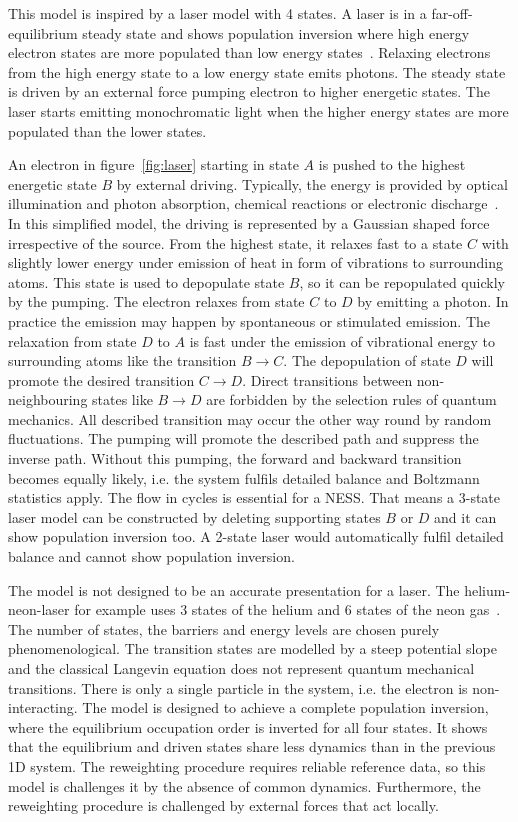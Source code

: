 This model is inspired by a laser model with 4 states. A laser is in a far-off-equilibrium steady state and shows population inversion where high energy electron states are more populated than low energy states~\cite{kaschke2013optical}. Relaxing electrons from the high energy state to a low energy state emits photons. The steady state is driven by an external force pumping  electron to higher energetic states. The laser starts emitting monochromatic light when the higher energy states are more  populated than the lower states. 

An electron in figure~\ref{fig:laser} starting in state $A$ is pushed to the highest energetic state $B$ by external driving. Typically, the energy is provided by optical illumination and photon absorption, chemical reactions or electronic discharge~\cite{kaschke2013optical}. In this simplified model, the driving is represented by a Gaussian shaped force irrespective of the source. From the highest state, it relaxes fast to a state $C$ with slightly lower energy under emission of heat in form of vibrations to surrounding atoms. This state is used to depopulate state $B$, so it can be repopulated quickly by the pumping. The electron relaxes from state $C$ to $D$  by emitting a photon. In practice the emission may happen by spontaneous or stimulated emission. The  relaxation from state $D$ to $A$ is fast under the emission of vibrational energy to surrounding atoms like the transition $B \rightarrow C$. 
The depopulation of state $D$ will promote the desired transition $C \rightarrow D$. Direct transitions between non-neighbouring states like $B \rightarrow D$ are forbidden by the selection rules of quantum mechanics. All described transition may occur the other way round by random fluctuations. The pumping will promote the described path and suppress the inverse path. Without this pumping, the forward and backward transition becomes equally likely, i.e. the system fulfils detailed balance and Boltzmann statistics apply. The flow in cycles is essential for a NESS. That means a 3-state laser model can be constructed by deleting supporting states $B$ or $D$ and it can show population inversion too. A 2-state laser would automatically fulfil detailed balance and cannot show population inversion.

The model is not designed to be an accurate presentation for a laser. The helium-neon-laser for example uses 3 states of the helium and 6 states of the neon gas~\cite{leach2014fundamental}. The number of states, the barriers and energy levels are chosen purely phenomenological. The transition states are modelled by a steep potential slope and the classical Langevin equation does not represent quantum mechanical transitions. There is only a single particle in the system, i.e. the electron is non-interacting. The model is designed to achieve a complete population inversion, where the equilibrium occupation order is inverted for all four states. It shows that the equilibrium and driven states share less dynamics than in the previous 1D system. The reweighting procedure requires reliable reference data, so this model is challenges it by the absence of common dynamics. Furthermore, the reweighting procedure is challenged by external forces that act locally.

